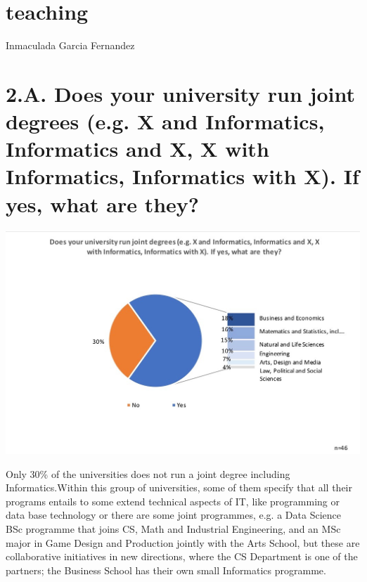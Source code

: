 \section{teaching}

Inmaculada Garcia Fernandez
\section {2.A. Does your university run joint degrees (e.g. X and Informatics, Informatics and X, X with Informatics, Informatics with X). If yes, what are they?}

\includegraphics[width = \linewidth]{charts/2a.jpg}

Only 30\% of the universities does not run a joint degree including Informatics.Within this group of universities, some of them specify that all their programs entails to some extend technical aspects of IT, like programming or data base technology or there are some joint programmes, e.g. a Data Science BSc programme that joins CS, Math and Industrial Engineering, and an MSc major in Game Design and Production jointly with the Arts School, but these are collaborative initiatives in new directions, where the CS Department is one of the partners; the Business School has their own small Informatics programme.

